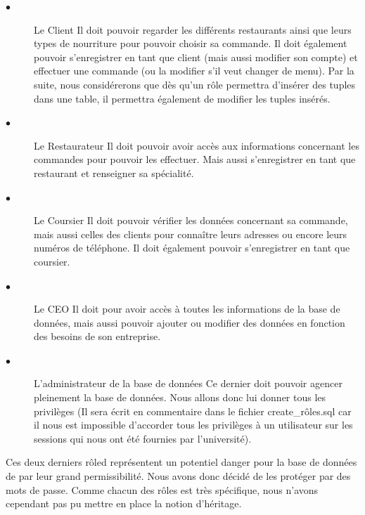 \documentclass[french]{article}
\begin{document}
                \begin{description}
                    \item[$\bullet$]Le Client\newline
                     Il doit pouvoir regarder les différents restaurants ainsi que leurs types de nourriture pour pouvoir choisir sa commande. Il doit également pouvoir s'enregistrer en tant que client (mais aussi modifier son compte) et effectuer une commande (ou la modifier s'il veut changer de menu). Par la suite, nous considérerons que dès qu'un rôle permettra d'insérer des tuples dans une table, il permettra également de modifier les tuples insérés.

                    \item[$\bullet$]Le Restaurateur\newline
                     Il doit pouvoir avoir accès aux informations concernant les commandes pour pouvoir les effectuer. Mais aussi s'enregistrer en tant que restaurant et renseigner sa spécialité.

                    \item[$\bullet$]Le Coursier\newline
                     Il doit pouvoir vérifier les données concernant sa commande, mais aussi celles des clients pour connaître leurs adresses ou encore leurs numéros de téléphone. Il doit également pouvoir s'enregistrer en tant que coursier.

                    \item[$\bullet$]Le CEO\newline
                     Il doit pour avoir accès à toutes les informations de la base de données, mais aussi pouvoir ajouter ou modifier des données en fonction des besoins de son entreprise. 

                    \item[$\bullet$]L'administrateur de la base de données\newline
                     Ce dernier doit pouvoir agencer pleinement la base de données. Nous allons donc lui donner tous les privilèges (Il sera écrit en commentaire dans le fichier create\_rôles.sql car il nous est impossible d'accorder tous les privilèges à un utilisateur sur les sessions qui nous ont été fournies par l'université).
                \end{description}

                Ces deux derniers rôled représentent un potentiel danger pour la base de données de par leur grand permissibilité. Nous avons donc décidé de les protéger par des mots de passe.\newline
                Comme chacun des rôles est très spécifique, nous n'avons cependant pas pu mettre en place la notion d'héritage.
\end{document}
